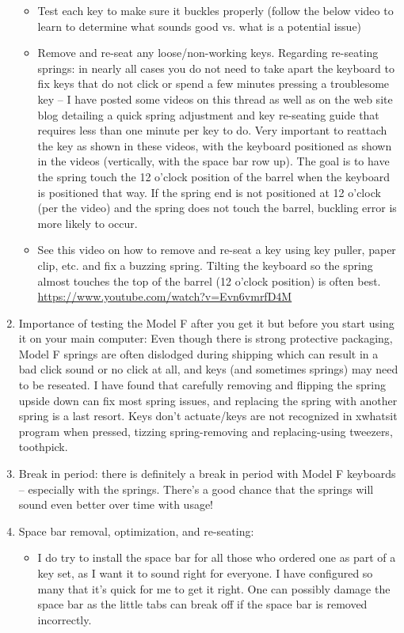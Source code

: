 \documentclass[a5paper, twoside]{memoir}
\begin{document}
\begin{enumerate}
\begin{itemize}
\item         Test each key to make sure it buckles properly (follow the below video to learn to determine what sounds good vs. what is a potential issue)
\item         Remove and re-seat any loose/non-working keys.  Regarding re-seating springs: in nearly all cases you do not need to take apart the keyboard to fix keys that do not click or spend a few minutes pressing a troublesome key – I have posted some videos on this thread as well as on the web site blog detailing a quick spring adjustment and key re-seating guide that requires less than one minute per key to do. Very important to reattach the key as shown in these videos, with the keyboard positioned as shown in the videos (vertically, with the space bar row up). The goal is to have the spring touch the 12 o’clock position of the barrel when the keyboard is positioned that way. If the spring end is not positioned at 12 o’clock (per the video) and the spring does not touch the barrel, buckling error is more likely to occur.
\item         See this video on how to remove and re-seat a key using key puller, paper clip, etc. and fix a buzzing spring. Tilting the keyboard so the spring almost touches the top of the barrel (12 o’clock position) is often best. \url{https://www.youtube.com/watch?v=Evn6vmrfD4M}
\end{itemize}
\item     Importance of testing the Model F after you get it but before you start using it on your main computer: Even though there is strong protective packaging, Model F springs are often dislodged during shipping which can result in a bad click sound or no click at all, and keys (and sometimes springs) may need to be reseated. I have found that carefully removing and flipping the spring upside down can fix most spring issues, and replacing the spring with another spring is a last resort. Keys don’t actuate/keys are not recognized in xwhatsit program when pressed, tizzing spring-removing and replacing-using tweezers, toothpick.
\item     Break in period:  there is definitely a break in period with Model F keyboards – especially with the springs.  There’s a good chance that the springs will sound even better over time with usage!
\item     Space bar removal, optimization, and re-seating:
\begin{itemize}
\item         I do try to install the space bar for all those who ordered one as part of a key set, as I want it to sound right for everyone. I have configured so many that it’s quick for me to get it right. One can possibly damage the space bar as the little tabs can break off if the space bar is removed incorrectly.


\end{itemize}
\end{enumerate}
\end{document}
